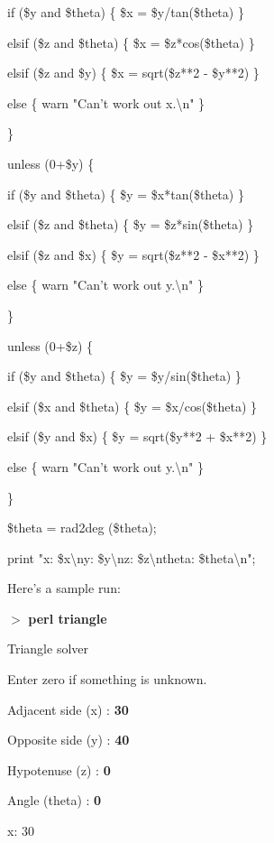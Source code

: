 \documentclass[a4paper,11pt]{book}
\begin{document}
\noindent if (\$y and \$theta) \{ \$x = \$y/tan(\$theta) \}

\noindent elsif (\$z and \$theta) \{ \$x = \$z*cos(\$theta) \}

\noindent elsif (\$z and \$y) \{ \$x = sqrt(\$z**2 - \$y**2) \}

\noindent else  \{ warn "Can't work out x.\textbackslash n" \}

\noindent \}

\noindent unless (0+\$y) \{

\noindent if (\$y and \$theta) \{ \$y = \$x*tan(\$theta) \}

\noindent elsif (\$z and \$theta) \{ \$y = \$z*sin(\$theta) \}

\noindent elsif (\$z and \$x) \{ \$y = sqrt(\$z**2 - \$x**2) \}

\noindent else  \{ warn "Can't work out y.\textbackslash n" \}

\noindent \}

\noindent unless (0+\$z) \{

\noindent if (\$y and \$theta) \{ \$y = \$y/sin(\$theta) \}

\noindent elsif (\$x and \$theta) \{ \$y = \$x/cos(\$theta) \}

\noindent elsif (\$y and \$x) \{ \$y = sqrt(\$y**2 + \$x**2) \}

\noindent else  \{ warn "Can't work out y.\textbackslash n" \}

\noindent \}

\noindent 

\noindent \$theta = rad2deg (\$theta);

\noindent print "x: \$x\textbackslash ny: \$y\textbackslash nz: \$z\textbackslash ntheta: \$theta\textbackslash n";

\noindent 

\noindent Here's a sample run:

\noindent 

\noindent $>$ \textbf{perl triangle}

\noindent Triangle solver

\noindent Enter zero if something is unknown.

\noindent Adjacent side (x) : \textbf{30}

\noindent Opposite side (y) : \textbf{40}

\noindent Hypotenuse (z) : \textbf{0}

\noindent Angle (theta) : \textbf{0}

\noindent x: 30
\end{document}
